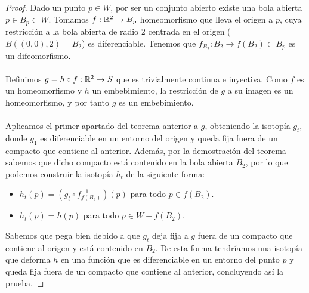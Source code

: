 \begin{proof}
	Dado un punto $p \in W$, por ser un conjunto abierto existe una bola abierta $p \in B_p \subset W$. Tomamos $f: \mathbb{R}^2 \rightarrow B_p$ homeomorfismo que lleva el origen a $p$, cuya restricción a la bola abierta de radio $2$ centrada en el origen ($B((0,0), 2)=B_2$) es diferenciable. Tenemos que $f_{B_2} : B_2 \rightarrow f(B_2) \subset B_p$ es un difeomorfismo.\\
	\\Definimos $g=h \circ f: \mathbb{R}^2 \rightarrow S$ que es trivialmente continua e inyectiva. Como $f$ es un homeomorfismo y $h$ un embebimiento, la restricción de $g$ a su imagen es un homeomorfismo, y por tanto $g$ es un embebimiento.\\
	\\Aplicamos el primer apartado del teorema anterior a $g$, obteniendo la isotopía $g_t$, donde $g_1$ es diferenciable en un entorno del origen y queda fija fuera de un compacto que contiene al anterior. Además, por la demostración del teorema sabemos que dicho compacto está contenido en la bola abierta $B_2$, por lo que podemos construir la isotopía $h_t$ de la siguiente forma:
	\begin{itemize}
		\item $h_t(p)=(g_t \circ f_{f(B_2)}^{-1})(p)$ para todo $p \in f(B_2)$.
		\item $h_t(p)=h(p)$ para todo $p \in W - f(B_2)$.
	\end{itemize}
	Sabemos que pega bien debido a que $g_t$ deja fija a $g$ fuera de un compacto que contiene al origen y está contenido en $B_2$. De esta forma tendríamos una isotopía que deforma $h$ en una función que es diferenciable en un entorno del punto $p$ y queda fija fuera de un compacto que contiene al anterior, concluyendo así la prueba.
\end{proof}


\endinput
